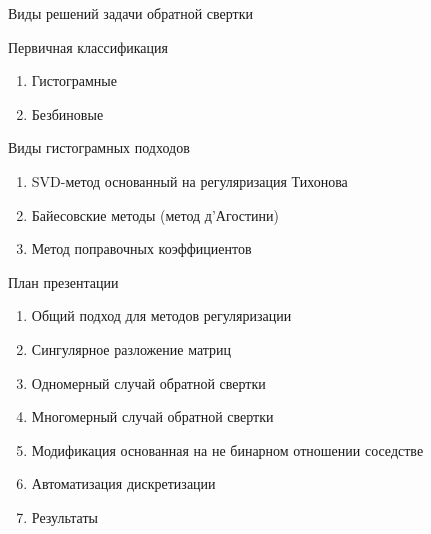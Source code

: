 \documentclass[fullscreen=true,russian,compress,%
	hyperref={unicode,bookmarks=false}]{presentation}
\begin{document}
\begin{frame}{Виды решений задачи обратной свертки}
   
   \begin{block}{Первичная классификация}
      \begin{enumerate}
         \item Гистограмные 
         \item Безбиновые
      \end{enumerate}
   \end{block}

   \begin{block}{Виды гистограмных подходов}
      \begin{enumerate}
         \item SVD-метод основанный на регуляризация Тихонова
         \item Байесовские методы (метод д’Агостини)
         \item Метод поправочных коэффициентов
      \end{enumerate}
   \end{block}
   
\end{frame}

\begin{frame}{План презентации}
  
\begin{enumerate}
   \item Общий подход для методов регуляризации
   \item Сингулярное разложение матриц
   \item Одномерный случай обратной свертки
   \item Многомерный случай обратной свертки
   \item Модификация основанная на не бинарном отношении соседстве
   \item Автоматизация дискретизации
   \item Результаты
\end{enumerate}

\end{frame}
\end{document}
